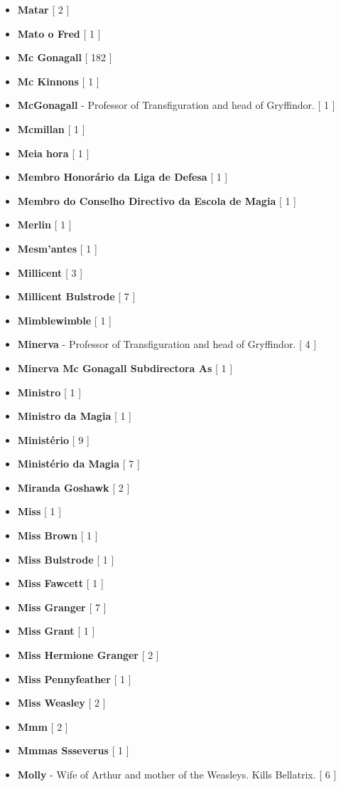 \documentclass[a4paper]{article}
\begin{document}
\begin{itemize}
	\item \textbf{Matar} [ 2 ]
	\item \textbf{Mato o Fred} [ 1 ]
	\item \textbf{Mc Gonagall} [ 182 ]
	\item \textbf{Mc Kinnons} [ 1 ]
	\item \textbf{McGonagall} - Professor of Transfiguration and head of Gryffindor. [ 1 ]
	\item \textbf{Mcmillan} [ 1 ]
	\item \textbf{Meia hora} [ 1 ]
	\item \textbf{Membro Honorário da Liga de Defesa} [ 1 ]
	\item \textbf{Membro do Conselho Directivo da Escola de Magia} [ 1 ]
	\item \textbf{Merlin} [ 1 ]
	\item \textbf{Mesm'antes} [ 1 ]
	\item \textbf{Millicent} [ 3 ]
	\item \textbf{Millicent Bulstrode} [ 7 ]
	\item \textbf{Mimblewimble} [ 1 ]
	\item \textbf{Minerva} - Professor of Transfiguration and head of Gryffindor. [ 4 ]
	\item \textbf{Minerva Mc Gonagall Subdirectora As} [ 1 ]
	\item \textbf{Ministro} [ 1 ]
	\item \textbf{Ministro da Magia} [ 1 ]
	\item \textbf{Ministério} [ 9 ]
	\item \textbf{Ministério da Magia} [ 7 ]
	\item \textbf{Miranda Goshawk} [ 2 ]
	\item \textbf{Miss} [ 1 ]
	\item \textbf{Miss Brown} [ 1 ]
	\item \textbf{Miss Bulstrode} [ 1 ]
	\item \textbf{Miss Fawcett} [ 1 ]
	\item \textbf{Miss Granger} [ 7 ]
	\item \textbf{Miss Grant} [ 1 ]
	\item \textbf{Miss Hermione Granger} [ 2 ]
	\item \textbf{Miss Pennyfeather} [ 1 ]
	\item \textbf{Miss Weasley} [ 2 ]
	\item \textbf{Mmm} [ 2 ]
	\item \textbf{Mmmas Ssseverus} [ 1 ]
	\item \textbf{Molly} - Wife of Arthur and mother of the Weasleys. Kills Bellatrix. [ 6 ]

\end{itemize}
\end{document}
